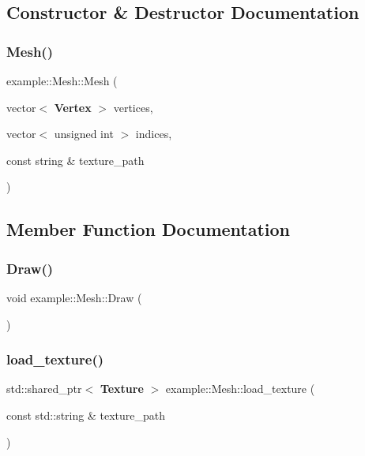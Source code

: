 \subsection{Constructor \& Destructor Documentation}
\mbox{\label{classexample_1_1_mesh_a213f5ebfb1aab636c83145d5b8cbcbea}} 
\subsubsection{Mesh()}
{\footnotesize\ttfamily example\+::\+Mesh\+::\+Mesh (\begin{DoxyParamCaption}\item[{vector$<$ \textbf{ Vertex} $>$}]{vertices,  }\item[{vector$<$ unsigned int $>$}]{indices,  }\item[{const string \&}]{texture\+\_\+path }\end{DoxyParamCaption})}



\subsection{Member Function Documentation}
\mbox{\label{classexample_1_1_mesh_a2b79e0b8b79bad1bafd868b2d356c737}} 
\subsubsection{Draw()}
{\footnotesize\ttfamily void example\+::\+Mesh\+::\+Draw (\begin{DoxyParamCaption}{ }\end{DoxyParamCaption})}

\mbox{\label{classexample_1_1_mesh_a298605e06889f405c8121d6668ca1250}} 
\subsubsection{load\_texture()}
{\footnotesize\ttfamily std\+::shared\+\_\+ptr$<$ \textbf{ Texture} $>$ example\+::\+Mesh\+::load\+\_\+texture (\begin{DoxyParamCaption}\item[{const std\+::string \&}]{texture\+\_\+path }\end{DoxyParamCaption})\hspace{0.3cm}{\ttfamily [inline]}}

